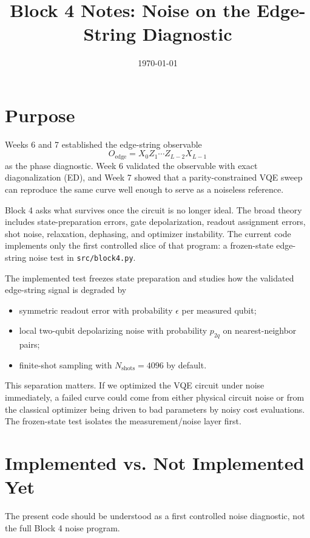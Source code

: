 \documentclass[11pt]{article}
\title{Block 4 Notes: Noise on the Edge-String Diagnostic}
\author{}
\date{\today}
\newcommand{\Oedge}{X_0 Z_1\cdots Z_{L-2} X_{L-1}}
\begin{document}
\maketitle

\section{Purpose}

Weeks 6 and 7 established the edge-string observable
\[
  O_{\mathrm{edge}} = \Oedge
\]
as the phase diagnostic. Week 6 validated the observable with exact diagonalization (ED), and Week 7 showed that a parity-constrained VQE sweep can reproduce the same curve well enough to serve as a noiseless reference.

Block 4 asks what survives once the circuit is no longer ideal. The broad theory includes state-preparation errors, gate depolarization, readout assignment errors, shot noise, relaxation, dephasing, and optimizer instability. The current code implements only the first controlled slice of that program: a frozen-state edge-string noise test in \texttt{src/block4.py}.

The implemented test freezes state preparation and studies how the validated edge-string signal is degraded by
\begin{itemize}
  \item symmetric readout error with probability $\epsilon$ per measured qubit;
  \item local two-qubit depolarizing noise with probability $p_{2q}$ on nearest-neighbor pairs;
  \item finite-shot sampling with $N_{\mathrm{shots}}=4096$ by default.
\end{itemize}

This separation matters. If we optimized the VQE circuit under noise immediately, a failed curve could come from either physical circuit noise or from the classical optimizer being driven to bad parameters by noisy cost evaluations. The frozen-state test isolates the measurement/noise layer first.


\section{Implemented vs. Not Implemented Yet}

The present code should be understood as a first controlled noise diagnostic, not the full Block 4 noise program.
\end{document}
